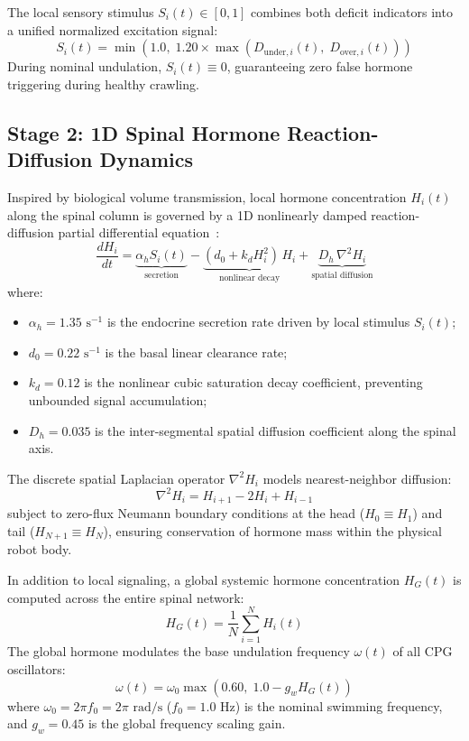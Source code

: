 \documentclass{iopjournal}
\begin{document}
The local sensory stimulus $S_i(t) \in [0, 1]$ combines both deficit indicators into a unified normalized excitation signal:
\begin{equation}
S_i(t) = \min\!\left(1.0,\; 1.20 \times \max\left(D_{\text{under},i}(t),\; D_{\text{over},i}(t)\right)\right)
\label{eq:stimulus}
\end{equation}
During nominal undulation, $S_i(t) \equiv 0$, guaranteeing zero false hormone triggering during healthy crawling.

\subsection{Stage 2: 1D Spinal Hormone Reaction-Diffusion Dynamics}
Inspired by biological volume transmission, local hormone concentration $H_i(t)$ along the spinal column is governed by a 1D nonlinearly damped reaction-diffusion partial differential equation~\cite{turing1952,meinhardt1982,arena2000}:
\begin{equation}
\frac{d H_i}{dt} = \underbrace{\alpha_h S_i(t)}_{\text{secretion}} - \underbrace{(d_0 + k_d H_i^2)\, H_i}_{\text{nonlinear decay}} + \underbrace{D_h\, \nabla^2 H_i}_{\text{spatial diffusion}}
\label{eq:hormone_ode}
\end{equation}
where:
\begin{itemize}
  \item $\alpha_h = 1.35\text{ s}^{-1}$ is the endocrine secretion rate driven by local stimulus $S_i(t)$;
  \item $d_0 = 0.22\text{ s}^{-1}$ is the basal linear clearance rate;
  \item $k_d = 0.12$ is the nonlinear cubic saturation decay coefficient, preventing unbounded signal accumulation;
  \item $D_h = 0.035$ is the inter-segmental spatial diffusion coefficient along the spinal axis.
\end{itemize}

The discrete spatial Laplacian operator $\nabla^2 H_i$ models nearest-neighbor diffusion:
\begin{equation}
\nabla^2 H_i = H_{i+1} - 2 H_i + H_{i-1}
\label{eq:laplacian}
\end{equation}
subject to zero-flux Neumann boundary conditions at the head ($H_0 \equiv H_1$) and tail ($H_{N+1} \equiv H_N$), ensuring conservation of hormone mass within the physical robot body.

In addition to local signaling, a global systemic hormone concentration $H_G(t)$ is computed across the entire spinal network:
\begin{equation}
H_G(t) = \frac{1}{N} \sum_{i=1}^N H_i(t)
\label{eq:global_hormone}
\end{equation}
The global hormone modulates the base undulation frequency $\omega(t)$ of all CPG oscillators:
\begin{equation}
\omega(t) = \omega_0 \max\!\left(0.60,\; 1.0 - g_w H_G(t)\right)
\label{eq:frequency_mod}
\end{equation}
where $\omega_0 = 2\pi f_0 = 2\pi\text{ rad/s}$ ($f_0 = 1.0\text{ Hz}$) is the nominal swimming frequency, and $g_w = 0.45$ is the global frequency scaling gain.
\end{document}
